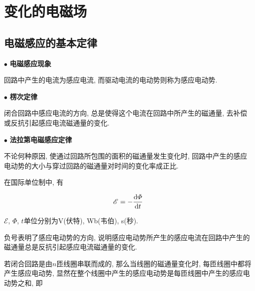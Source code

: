 \chapter{变化的电磁场}

\begin{introduction}
	\item {}
	\item {}
	\item {}
	\item {}
	\item {}
	\item {}
\end{introduction}

\section{电磁感应的基本定律}\label{9.1}

$\bullet$ \textbf{电磁感应现象}

回路中产生的电流为感应电流, 而驱动电流的电动势则称为感应电动势. 

$\bullet$ \textbf{楞次定律}

\begin{axiom}[楞次定律]
	闭合回路中感应电流的方向, 总是使得这个电流在回路中所产生的磁通量, 去补偿或反抗引起感应电流磁通量的变化.
\end{axiom}

$\bullet$ \textbf{法拉第电磁感应定律}

\begin{axiom}[法拉第电磁感应定律]
	不论何种原因, 使通过回路所包围的面积的磁通量发生变化时, 回路中产生的感应电动势的大小与穿过回路的磁通量对时间的变化率成正比. 
	
	在国际单位制中, 有
	
	\begin{equation}
		\mathscr{E} = - \dv{\varPhi}{t} \label{C9-eq1}
	\end{equation}
	
	$\mathscr{E}$, $\varPhi$, $t$单位分别为V(伏特), Wb(韦伯), s(秒). 
	
	负号表明了感应电动势的方向, 说明感应电动势所产生的感应电流在回路中产生的磁通量总是反抗引起感应电流磁通量的变化. 
\end{axiom}

若闭合回路是由$n$匝线圈串联而成的, 那么当线圈的磁通量变化时, 每匝线圈中都将产生感应电动势, 显然在整个线圈中产生的感应电动势是每匝线圈中产生的感应电动势之和, 即

